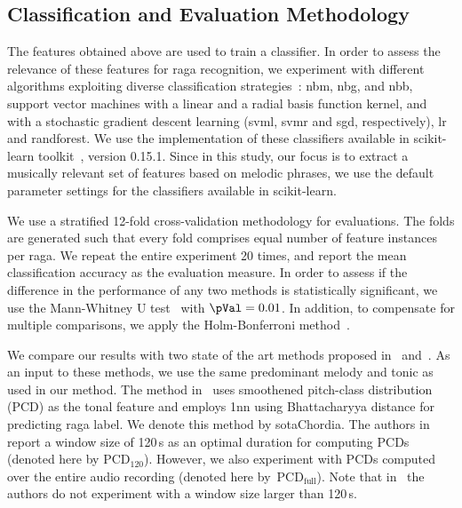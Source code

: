 \subsection{Classification and Evaluation Methodology}
\label{sec:classification_based_raga_recognition}

The features obtained above are used to train a classifier. In order to assess the relevance of these features for \gls{raga} recognition, we experiment with different algorithms exploiting diverse classification strategies~\cite{Hastie09BOOK}: \acrfull{nbm}, \acrfull{nbg}, and \acrfull{nbb}, support vector machines with a linear and a radial basis function kernel, and with a stochastic gradient descent learning (\acrshort{svml}, \acrshort{svmr} and \acrshort{sgd}, respectively), \acrfull{lr} and \acrfull{randforest}. We use the implementation of these classifiers available in scikit-learn toolkit~\cite{scikitlearn}, version 0.15.1. Since in this study, our focus is to extract a musically relevant set of features based on melodic phrases, we use the  default parameter settings for the classifiers available in scikit-learn. 

We use a stratified 12-fold cross-validation methodology for evaluations. The folds are generated such that every fold comprises equal number of feature instances per \gls{raga}. We repeat the entire experiment 20 times, and report the mean classification accuracy as the evaluation measure. In order to assess if the difference in the performance of any two methods is statistically significant, we use the Mann-Whitney U test~\cite{mann1947test} with $\pVal=0.01$. In addition, to compensate for multiple comparisons, we apply the Holm-Bonferroni method~\cite{holm1979simple}. 

We compare our results with two state of the art methods proposed in~\cite{chordia2013joint} and~\cite{koduri2014intonation}. As an input to these methods, we use the same predominant melody and tonic as used in our method. The method in~\cite{chordia2013joint} uses smoothened pitch-class distribution (PCD) as the tonal feature and employs \acrfull{1nn} using Bhattacharyya distance for predicting \gls{raga} label. We denote this method by \acrshort{sotaChordia}. The authors in~\cite{chordia2013joint} report a window size of 120\,s as an optimal duration for computing PCDs (denoted here by $\mathrm{PCD}_{120}$). However, we also experiment with PCDs computed over the entire audio recording (denoted here by~$\mathrm{PCD}_\mathrm{full}$). Note that in~\cite{chordia2013joint} the authors do not experiment with a window size larger than 120\,s. 

